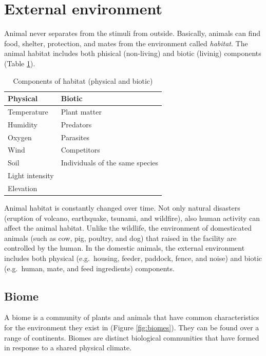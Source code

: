 \documentclass[]{book}
\begin{document}
\section{External environment}\label{external-environment}

Animal never separates from the stimuli from outside. Basically, animals
can find food, shelter, protection, and mates from the environment
called \emph{habitat}. The animal habitat includes both phisical
(non-living) and biotic (livinig) components (Table \ref{tab:habitat}).

\begin{table}[t]

\caption{\label{tab:habitat}Components of habitat (physical and biotic)}
\centering
\begin{tabular}{ll}
\toprule
Physical & Biotic\\
\midrule
Temperature & Plant matter\\
Humidity & Predators\\
Oxygen & Parasites\\
Wind & Competitors\\
Soil & Individuals of the same species\\
\addlinespace
Light intensity & \\
Elevation & \\
\bottomrule
\end{tabular}
\end{table}

Animal habitat is constantly changed over time. Not only natural
disasters (eruption of volcano, earthquake, tsunami, and wildfire), also
human activity can affect the animal habitat. Unlike the wildlife, the
environment of domesticated animals (such as cow, pig, poultry, and dog)
that raised in the facility are controlled by the human. In the domestic
animals, the external environment includes both physical (e.g.~housing,
feeder, paddock, fence, and noise) and biotic (e.g.~human, mate, and
feed ingredients) components.

\subsection{Biome}\label{biome}

A biome is a community of plants and animals that have common
characteristics for the environment they exist in (Figure
\ref{fig:biomes}). They can be found over a range of continents. Biomes
are distinct biological communities that have formed in response to a
shared physical climate.
\end{document}
